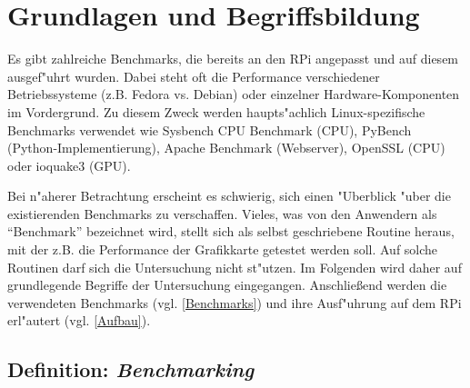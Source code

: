 \chapter{Grundlagen und Begriffsbildung}\label{Kap2}

Es gibt zahlreiche Benchmarks, die bereits an den RPi angepasst und auf diesem ausgef"uhrt wurden. Dabei steht oft die Performance verschiedener Betriebssysteme (z.B. Fedora vs. Debian) oder einzelner Hardware-Komponen\-ten im Vordergrund. Zu diesem Zweck werden haupts"achlich Linux-spezifische Benchmarks verwendet wie Sysbench CPU Benchmark (CPU), PyBench (Python-Implementierung), Apache Benchmark (Webserver), Open\-SSL (CPU) oder ioquake3 (GPU). 

Bei n"aherer Betrachtung erscheint es schwierig, sich einen "Uberblick "uber die existierenden Benchmarks zu verschaffen. Vieles, was von den Anwendern als "`Benchmark"' bezeichnet wird, stellt sich als selbst geschriebene Routine heraus, mit der z.B. die Performance der Grafikkarte getestet werden soll. Auf solche Routinen darf sich die Untersuchung nicht st"utzen. Im Folgenden wird daher auf grundlegende Begriffe der Untersuchung eingegangen. Anschlie\ss end werden die verwendeten Benchmarks (vgl. \ref{Benchmarks}) und ihre Ausf"uhrung auf dem RPi erl"autert (vgl. \ref{Aufbau}). 

\section{Definition: \textit{Benchmarking}}\label{Benchmarking}

